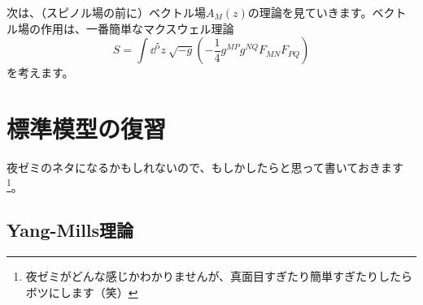 \documentclass[unicode,a4paper,10pt]{ltjsarticle}
\renewcommand{\theequation}{\thesection.\arabic{equation}}
\renewcommand{\thefigure}{\thesection.\arabic{figure}}
\renewcommand{\thetable}{\thesection.\arabic{table}}
\begin{document}
次は、（スピノル場の前に）ベクトル場$A_{M}(z)$の理論を見ていきます。ベクトル場の作用は、一番簡単なマクスウェル理論
\begin{equation}
   S
   =
   \int\dd^5 z\ 
   \sqrt{-g}
   \left(  
      -\frac{1}{4}g^{MP}g^{NQ}F_{MN}F_{PQ}
   \right)
\end{equation}
を考えます。
























\clearpage
\makeatletter
\renewcommand{\appendix}{\par
  \setcounter{section}{0}%
  \setcounter{subsection}{0}%
  \gdef\presectionname{\appendixname}%
  \gdef\postsectionname{}%
  \gdef\thesection{\presectionname\@Alph\c@section\postsectionname}%
  \gdef\thesubsection{\@Alph\c@section.\@arabic\c@subsection}%
  \renewcommand{\theequation}{\@Alph\c@section.\arabic{equation}}%
  \renewcommand{\thefigure}{\@Alph\c@section.\arabic{figure}}%
  \renewcommand{\thetable}{\@Alph\c@section.\arabic{table}}%
}
\makeatother
\appendix


\section{標準模型の復習}

夜ゼミのネタになるかもしれないので、もしかしたらと思って書いておきます\footnote{
   夜ゼミがどんな感じかわかりませんが、真面目すぎたり簡単すぎたりしたらボツにします（笑）
}。

\subsection{Yang-Mills理論}







\clearpage



\nocite{Peskin:1995}
\nocite{Wess:1992}
\nocite{Fujii:2005}
\nocite{Dine:2007zp}
\end{document}
